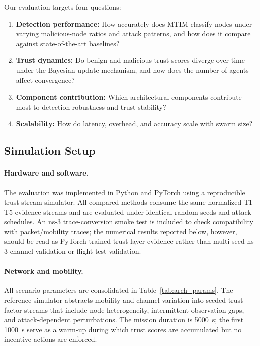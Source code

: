 \documentclass[notspecified,article,submit,moreauthors]{Definitions/mdpi}
\begin{document}
Our evaluation targets four questions:
\begin{enumerate}[label={(\textbf{Q\arabic*})},leftmargin=*]
    \item \textbf{Detection performance:} How accurately does MTIM classify nodes under varying malicious-node ratios and attack patterns, and how does it compare against state-of-the-art baselines?
    \item \textbf{Trust dynamics:} Do benign and malicious trust scores diverge over time under the Bayesian update mechanism, and how does the number of agents affect convergence?
    \item \textbf{Component contribution:} Which architectural components contribute most to detection robustness and trust stability?
    \item \textbf{Scalability:} How do latency, overhead, and accuracy scale with swarm size?
\end{enumerate}

\subsection{Simulation Setup}
\label{sec:sim_setup}

\paragraph{Hardware and software.}
The evaluation was implemented in Python and PyTorch using a reproducible trust-stream simulator. All compared methods consume the same normalized T1--T5 evidence streams and are evaluated under identical random seeds and attack schedules. An ns-3 trace-conversion smoke test is included to check compatibility with packet/mobility traces; the numerical results reported below, however, should be read as PyTorch-trained trust-layer evidence rather than multi-seed ns-3 channel validation or flight-test validation.

\paragraph{Network and mobility.}
All scenario parameters are consolidated in Table~\ref{tab:arch_params}. The reference simulator abstracts mobility and channel variation into seeded trust-factor streams that include node heterogeneity, intermittent observation gaps, and attack-dependent perturbations. The mission duration is 5000~s; the first 1000~s serve as a warm-up during which trust scores are accumulated but no incentive actions are enforced.
\end{document}
